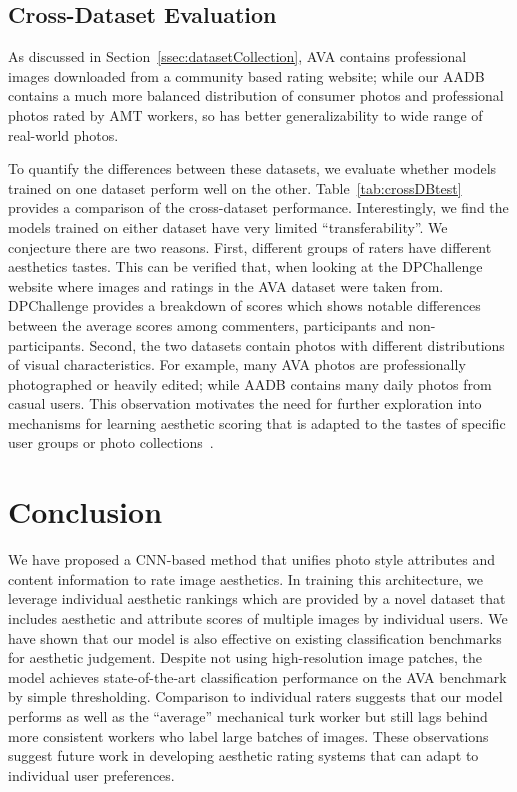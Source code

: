 \documentclass[runningheads]{llncs}
\begin{document}
\subsection{Cross-Dataset Evaluation}
\label{ssec:transferability}

As discussed in Section~\ref{ssec:datasetCollection},
AVA contains
professional images downloaded from a community based rating website; while our
AADB contains a much more balanced distribution of consumer photos and professional photos rated by AMT workers,
so has better generalizability to wide range of real-world photos.

To quantify the differences between these
datasets, we evaluate whether models trained on one dataset perform well
on the other.  Table~\ref{tab:crossDBtest} provides a comparison of the
cross-dataset performance.  Interestingly, we find the models trained on either
dataset have very limited ``transferability''.
We conjecture there are two reasons.  First, different groups of raters have
different aesthetics tastes.  This can be verified that, when looking at the
DPChallenge website where images and ratings in the AVA dataset were taken
from.  DPChallenge provides a breakdown of scores which shows notable
differences between the average scores among commenters, participants and
non-participants.  Second, the two datasets contain photos with different
distributions of visual characteristics.  For example, many AVA photos are
professionally photographed or heavily edited; while AADB contains many daily
photos from casual users.  This observation motivates the need for further
exploration into mechanisms for learning aesthetic scoring that is adapted to
the tastes of specific user groups or photo
collections~\cite{caicedo2011collaborative}.



\section{Conclusion}
We have proposed a CNN-based method that unifies photo style attributes and
content information to rate image aesthetics.  In training this architecture,
we leverage individual aesthetic rankings which are provided by a novel dataset
that includes aesthetic and attribute scores of multiple images by individual
users. We have shown that our model is also effective on existing
classification benchmarks for aesthetic judgement. Despite not using
high-resolution image patches, the model achieves state-of-the-art
classification performance on the AVA benchmark by simple thresholding.
Comparison to individual raters suggests that our model performs as well as the
``average'' mechanical turk worker but still lags behind more consistent
workers who label large batches of images.
These observations suggest future work in developing aesthetic rating systems that can adapt to individual user preferences.
\end{document}
